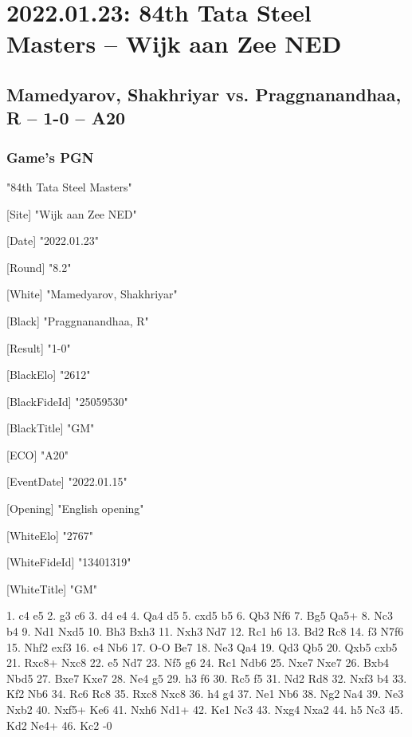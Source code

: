 \documentclass[9pt]{extarticle}
\begin{document}
\section*{2022.01.23: 84th Tata Steel Masters -- Wijk aan Zee NED}

\subsection*{Mamedyarov, Shakhriyar vs. Praggnanandhaa, R -- 1-0 -- A20}
\subsubsection*{Game's PGN}
\begin{flushleft}
[Event] "84th Tata Steel Masters"

[Site] "Wijk aan Zee NED"

[Date] "2022.01.23"

[Round] "8.2"

[White] "Mamedyarov, Shakhriyar"

[Black] "Praggnanandhaa, R"

[Result] "1-0"

[BlackElo] "2612"

[BlackFideId] "25059530"

[BlackTitle] "GM"

[ECO] "A20"

[EventDate] "2022.01.15"

[Opening] "English opening"

[WhiteElo] "2767"

[WhiteFideId] "13401319"

[WhiteTitle] "GM"

\end{flushleft}
\begin{flushleft}
1. c4 e5 2. g3 c6 3. d4 e4 4. Qa4 d5 5. cxd5 b5 6. Qb3 Nf6 7. Bg5 Qa5+ 8. Nc3 b4 9. Nd1 Nxd5 10. Bh3 Bxh3 11. Nxh3 Nd7 12. Rc1 h6 13. Bd2 Rc8 14. f3 N7f6 15. Nhf2 exf3 16. e4 Nb6 17. O-O Be7 18. Ne3 Qa4 19. Qd3 Qb5 20. Qxb5 cxb5 21. Rxc8+ Nxc8 22. e5 Nd7 23. Nf5 g6 24. Rc1 Ndb6 25. Nxe7 Nxe7 26. Bxb4 Nbd5 27. Bxe7 Kxe7 28. Ne4 g5 29. h3 f6 30. Rc5 f5 31. Nd2 Rd8 32. Nxf3 b4 33. Kf2 Nb6 34. Rc6 Rc8 35. Rxc8 Nxc8 36. h4 g4 37. Ne1 Nb6 38. Ng2 Na4 39. Ne3 Nxb2 40. Nxf5+ Ke6 41. Nxh6 Nd1+ 42. Ke1 Nc3 43. Nxg4 Nxa2 44. h5 Nc3 45. Kd2 Ne4+ 46. Kc2 \quad  {}-0
\end{flushleft}
\parindent 0mm
\end{document}
